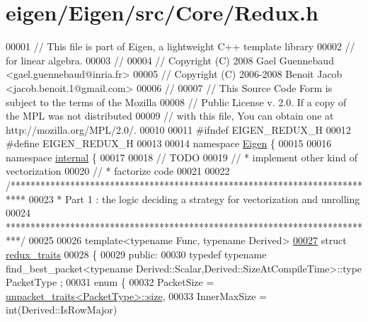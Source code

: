 \hypertarget{eigen_2_eigen_2src_2_core_2_redux_8h_source}{}\section{eigen/\+Eigen/src/\+Core/\+Redux.h}
\label{eigen_2_eigen_2src_2_core_2_redux_8h_source}

\begin{DoxyCode}
00001 \textcolor{comment}{// This file is part of Eigen, a lightweight C++ template library}
00002 \textcolor{comment}{// for linear algebra.}
00003 \textcolor{comment}{//}
00004 \textcolor{comment}{// Copyright (C) 2008 Gael Guennebaud <gael.guennebaud@inria.fr>}
00005 \textcolor{comment}{// Copyright (C) 2006-2008 Benoit Jacob <jacob.benoit.1@gmail.com>}
00006 \textcolor{comment}{//}
00007 \textcolor{comment}{// This Source Code Form is subject to the terms of the Mozilla}
00008 \textcolor{comment}{// Public License v. 2.0. If a copy of the MPL was not distributed}
00009 \textcolor{comment}{// with this file, You can obtain one at http://mozilla.org/MPL/2.0/.}
00010 
00011 \textcolor{preprocessor}{#ifndef EIGEN\_REDUX\_H}
00012 \textcolor{preprocessor}{#define EIGEN\_REDUX\_H}
00013 
00014 \textcolor{keyword}{namespace }\hyperlink{namespace_eigen}{Eigen} \{ 
00015 
00016 \textcolor{keyword}{namespace }\hyperlink{namespaceinternal}{internal} \{
00017 
00018 \textcolor{comment}{// TODO}
00019 \textcolor{comment}{//  * implement other kind of vectorization}
00020 \textcolor{comment}{//  * factorize code}
00021 
00022 \textcolor{comment}{/***************************************************************************}
00023 \textcolor{comment}{* Part 1 : the logic deciding a strategy for vectorization and unrolling}
00024 \textcolor{comment}{***************************************************************************/}
00025 
00026 \textcolor{keyword}{template}<\textcolor{keyword}{typename} Func, \textcolor{keyword}{typename} Derived>
\hyperlink{struct_eigen_1_1internal_1_1redux__traits}{00027} \textcolor{keyword}{struct }\hyperlink{struct_eigen_1_1internal_1_1redux__traits}{redux\_traits}
00028 \{
00029 \textcolor{keyword}{public}:
00030     \textcolor{keyword}{typedef} \textcolor{keyword}{typename} find\_best\_packet<typename Derived::Scalar,Derived::SizeAtCompileTime>::type PacketType
      ;
00031   \textcolor{keyword}{enum} \{
00032     PacketSize = \hyperlink{struct_eigen_1_1internal_1_1unpacket__traits}{unpacket\_traits<PacketType>::size},
00033     InnerMaxSize = int(Derived::IsRowMajor)

\end{DoxyCode}

